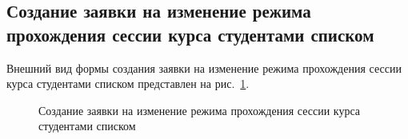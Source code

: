 \subsection{Создание заявки на изменение режима прохождения сессии курса студентами списком}
Внешний вид формы создания заявки на изменение режима прохождения сессии курса студентами списком 
представлен на рис.~\ref{img:student:mass_change_mode_req_create}.

\begin{figure}[H]
	\caption{Создание заявки на изменение режима прохождения сессии курса студентами списком}
	\label{img:student:mass_change_mode_req_create}
\end{figure}

